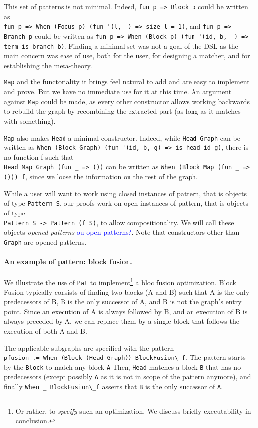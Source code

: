 \documentclass[11pt]{article}
\newcommand{\inlinecoq}[1]{\mbox{\lstinline[style=customcoq,columns=fixed,basewidth=.48em]{#1}}}
\newcommand{\ilc}[1]{\inlinecoq{#1}}
\newcommand{\leon}[1]{\textcolor{blue}{#1}}
\newcommand{\pat}{\texttt{Pat}\xspace}
\begin{document}
This set of patterns is not minimal. Indeed, \ilc{fun p => Block p} could be written as\\\ilc{fun p => When (Focus p) (fun '(l, _) => size l = 1)}, and \ilc{fun p => Branch p} could be written as \ilc{fun p => When (Block p) (fun '(id, b, _) => term_is_branch b)}. Finding a minimal set was not a goal of the DSL as the main concern was ease of use, both for the user, for designing a matcher, and for establishing the meta-theory. 

\ilc{Map} and the functoriality it brings feel natural to add and are easy to implement and prove. But we have no immediate use for it at this time. An argument against \ilc{Map} could be made, as every other constructor allows working backwards to rebuild the graph by recombining the extracted part (as long as it matches with something).

\ilc{Map} also makes \ilc{Head} a minimal constructor. Indeed, while \ilc{Head Graph} can be written as \ilc{When (Block Graph) (fun '(id, b, g) => is_head id g)}, there is no function f such that\\\ilc{Head Map Graph (fun _ => ())} can be written as \ilc{When (Block Map (fun _ => ())) f}, since we loose the information on the rest of the graph.

While a user will want to work using closed instances of pattern, that is objects of type \ilc{Pattern S}, our proofs work on open instances of pattern, that is objects of type\\\ilc{Pattern S -> Pattern (f S)}, to allow compositionality. We will call these objects \emph{opened patterns} \leon{ou open patterns?}. Note that constructors other than \ilc{Graph} are opened patterns.

\paragraph*{An example of pattern: block fusion.}
We illustrate the use of \pat{} to implement\footnote{Or rather, to \emph{specify} such an optimization. We discuss briefly executability in conclusion.} a bloc fusion optimization.
Block Fusion typically consists of finding two blocks (A and B) such that A is the only predecessors of B, B is the only successor of A, and B is not the graph's entry point. Since an execution of A is always followed by B, and an execution of B is always preceded by A, we can replace them by a single block that follows the execution of both A and B.

The applicable subgraphs are specified with the pattern\\\ilc{pfusion := When (Block (Head Graph)) BlockFusion\_f}.
The pattern starts by the \ilc{Block} to match any block \ilc{A} Then, \ilc{Head} matches a block \ilc{B} that has no predecessors (except possibly \ilc{A} as it is not in scope of the pattern anymore), and finally \ilc{When _ BlockFusion\_f} asserts that \ilc{B} is the only successor of \ilc{A}.
\end{document}
